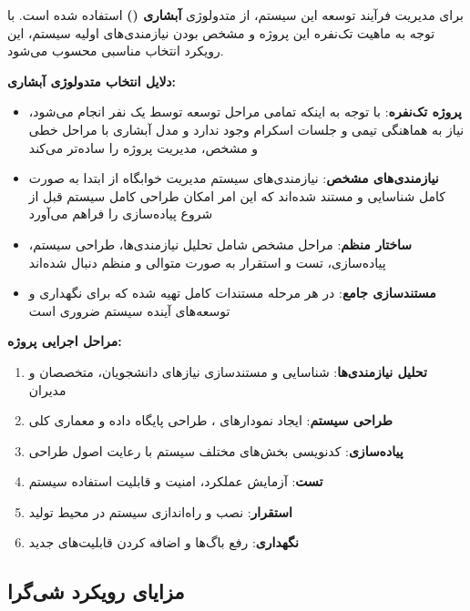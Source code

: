 \documentclass[12pt,a4paper]{report}
\begin{document}
	برای مدیریت فرآیند توسعه این سیستم، از متدولوژی \textbf{آبشاری ()} استفاده شده است. با توجه به ماهیت تک‌نفره این پروژه و مشخص بودن نیازمندی‌های اولیه سیستم، این رویکرد انتخاب مناسبی محسوب می‌شود.
	
	\textbf{دلایل انتخاب متدولوژی آبشاری:}
	
	\begin{itemize}
		\item \textbf{پروژه تک‌نفره}: با توجه به اینکه تمامی مراحل توسعه توسط یک نفر انجام می‌شود، نیاز به هماهنگی تیمی و جلسات اسکرام وجود ندارد و مدل آبشاری با مراحل خطی و مشخص، مدیریت پروژه را ساده‌تر می‌کند
		
		\item \textbf{نیازمندی‌های مشخص}: نیازمندی‌های سیستم مدیریت خوابگاه از ابتدا به صورت کامل شناسایی و مستند شده‌اند که این امر امکان طراحی کامل سیستم قبل از شروع پیاده‌سازی را فراهم می‌آورد
		
		\item \textbf{ساختار منظم}: مراحل مشخص شامل تحلیل نیازمندی‌ها، طراحی سیستم، پیاده‌سازی، تست و استقرار به صورت متوالی و منظم دنبال شده‌اند
		
		\item \textbf{مستندسازی جامع}: در هر مرحله مستندات کامل تهیه شده که برای نگهداری و توسعه‌های آینده سیستم ضروری است
	\end{itemize}
	
	\textbf{مراحل اجرایی پروژه:}
	
	\begin{enumerate}
		\item \textbf{تحلیل نیازمندی‌ها}: شناسایی و مستندسازی نیازهای دانشجویان، متخصصان و مدیران
		\item \textbf{طراحی سیستم}: ایجاد نمودارهای ، طراحی پایگاه داده و معماری کلی
		\item \textbf{پیاده‌سازی}: کدنویسی بخش‌های مختلف سیستم با رعایت اصول طراحی
		\item \textbf{تست}: آزمایش عملکرد، امنیت و قابلیت استفاده سیستم
		\item \textbf{استقرار}: نصب و راه‌اندازی سیستم در محیط تولید
		\item \textbf{نگهداری}: رفع باگ‌ها و اضافه کردن قابلیت‌های جدید
	\end{enumerate}
	
	\subsection{مزایای رویکرد شی‌گرا}
	
\end{document}
